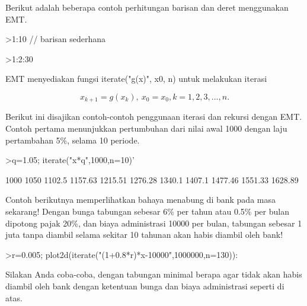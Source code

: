 \documentclass[a4paper,10pt]{article}
\begin{document}
\begin{eulernotebook}
\begin{eulercomment}
\begin{eulercomment}
\begin{eulercomment}
\begin{eulercomment}
\begin{eulercomment}
\begin{eulercomment}
\begin{eulercomment}
\begin{eulercomment}
\begin{eulercomment}
Berikut adalah beberapa contoh perhitungan barisan dan deret menggunakan EMT.
\end{eulercomment}
\begin{eulerprompt}
>1:10 // barisan sederhana
\end{eulerprompt}
\begin{euleroutput}
  [1,  2,  3,  4,  5,  6,  7,  8,  9,  10]
\end{euleroutput}
\begin{eulerprompt}
>1:2:30
\end{eulerprompt}
\begin{euleroutput}
  [1,  3,  5,  7,  9,  11,  13,  15,  17,  19,  21,  23,  25,  27,  29]
\end{euleroutput}
\begin{eulercomment}
EMT menyediakan fungsi iterate("g(x)", x0, n) untuk melakukan iterasi

\end{eulercomment}
\begin{eulerformula}
\[
x_{k+1}=g(x_k), \ x_0=x_0, k= 1, 2, 3, ..., n.
\]
\end{eulerformula}
\begin{eulercomment}
Berikut ini disajikan contoh-contoh penggunaan iterasi dan rekursi
dengan EMT. Contoh pertama menunjukkan pertumbuhan dari nilai awal
1000 dengan laju pertambahan 5\%, selama 10 periode.
\end{eulercomment}
\begin{eulerprompt}
>q=1.05; iterate("x*q",1000,n=10)'
\end{eulerprompt}
\begin{euleroutput}
           1000 
           1050 
         1102.5 
        1157.63 
        1215.51 
        1276.28 
         1340.1 
         1407.1 
        1477.46 
        1551.33 
        1628.89 
\end{euleroutput}
\begin{eulercomment}
Contoh berikutnya memperlihatkan bahaya menabung di bank pada masa sekarang! Dengan bunga
tabungan sebesar 6\% per tahun atau 0.5\% per bulan dipotong pajak 20\%, dan biaya administrasi
10000 per bulan, tabungan sebesar 1 juta tanpa diambil selama sekitar 10 tahunan akan habis
diambil oleh bank!
\end{eulercomment}
\begin{eulerprompt}
>r=0.005; plot2d(iterate("(1+0.8*r)*x-10000",1000000,n=130)):
\end{eulerprompt}
\begin{eulercomment}
Silakan Anda coba-coba, dengan tabungan minimal berapa agar tidak akan habis diambil oleh
bank dengan ketentuan bunga dan biaya administrasi seperti di atas.


\end{eulercomment}
\end{eulercomment}
\end{eulercomment}
\end{eulercomment}
\end{eulercomment}
\end{eulercomment}
\end{eulercomment}
\end{eulercomment}
\end{eulercomment}
\end{eulernotebook}
\end{document}
